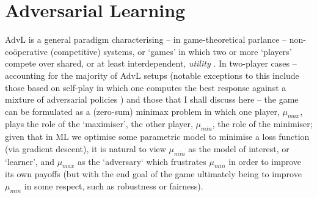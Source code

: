 \section{Adversarial Learning}\label{sec:advl}
\acf{AdvL} is a general paradigm characterising -- in game-theoretical parlance --
non-co{\"o}perative (competitive) systems, or `games' in which two or more `players' compete over
shared, or at least interdependent, \emph{utility} \citep{fudenberg1991game}.
%
%
In two-player cases -- accounting for the majority of \ac{AdvL} setups (notable exceptions to this
include those based on self-play in which one computes the best response against a mixture of
adversarial policies \citep{silver2017mastering, vinyals2019grandmaster}) and those that I shall
discuss here -- the game can be formulated as a (zero-sum) minimax problem in which one player,
\(\mu_{max}\), plays the role of the `maximiser', the other player, \(\mu_{min}\), the role of the
minimiser; given that in \ac{ML} we optimise some parametric model to minimise a loss function (via
gradient descent), it is natural to view \(\mu_{min}\) as the model of interest, or `learner', and
\(\mu_{max}\) as the `adversary` which frustrates \(\mu_{min}\) in order to improve its own payoffs
(but with the end goal of the game ultimately being to improve \(\mu_{min}\) in some respect, such
as robustness or fairness).
%

